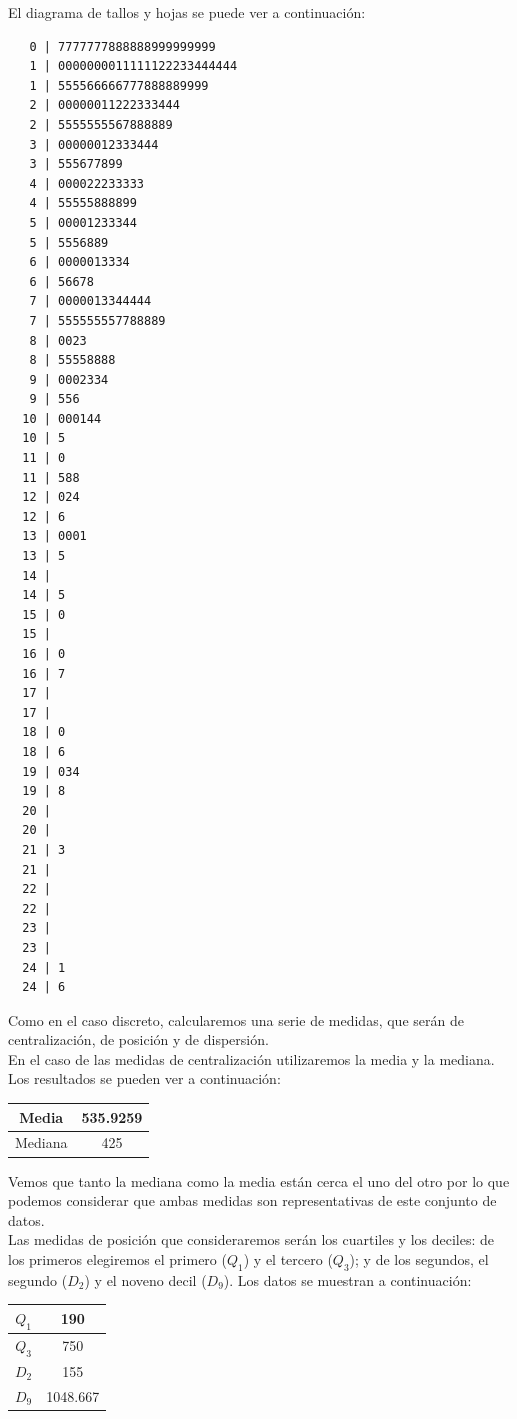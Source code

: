 \documentclass[12pt,a4paper,twoside,openright,titlepage,final]{article}
\begin{document}
El diagrama de tallos y hojas se puede ver a continuación:

\begin{verbatim}
   0 | 7777777888888999999999
   1 | 0000000011111122233444444
   1 | 555566666777888889999
   2 | 00000011222333444
   2 | 5555555567888889
   3 | 00000012333444
   3 | 555677899
   4 | 000022233333
   4 | 55555888899
   5 | 00001233344
   5 | 5556889
   6 | 0000013334
   6 | 56678
   7 | 0000013344444
   7 | 555555557788889
   8 | 0023
   8 | 55558888
   9 | 0002334
   9 | 556
  10 | 000144
  10 | 5
  11 | 0
  11 | 588
  12 | 024
  12 | 6
  13 | 0001
  13 | 5
  14 | 
  14 | 5
  15 | 0
  15 | 
  16 | 0
  16 | 7
  17 | 
  17 | 
  18 | 0
  18 | 6
  19 | 034
  19 | 8
  20 | 
  20 | 
  21 | 3
  21 | 
  22 | 
  22 | 
  23 | 
  23 | 
  24 | 1
  24 | 6

\end{verbatim}

Como en el caso discreto, calcularemos una serie de medidas, que serán de centralización, de posición y de dispersión.\\

En el caso de las medidas de centralización utilizaremos la media y la mediana. Los resultados se pueden ver a continuación:\\

\begin{table}[htbp]
\centering
\begin{tabular}{|c|c|}
\hline Media & 535.9259 \\ 
\hline Mediana & 425 \\ 
\hline 
\end{tabular} 
\end{table}

Vemos que tanto la mediana como la media están cerca el uno del otro por lo que podemos considerar que ambas medidas son representativas de este conjunto de datos.\\

Las medidas de posición que consideraremos serán los cuartiles y los deciles: de los primeros elegiremos el primero ($Q_1$) y el tercero ($Q_3$); y de los segundos, el segundo ($D_2$) y el noveno decil ($D_9$). Los datos se muestran a continuación:\\

\begin{table}[htbp]
\centering
\begin{tabular}{|c|c|}
\hline $Q_1$ & 190 \\ 
\hline $Q_3$ & 750 \\ 
\hline $D_2$& 155  \\ 
\hline $D_9$& 1048.667  \\ 
\hline 
\end{tabular} 
\end{table}
\end{document}
